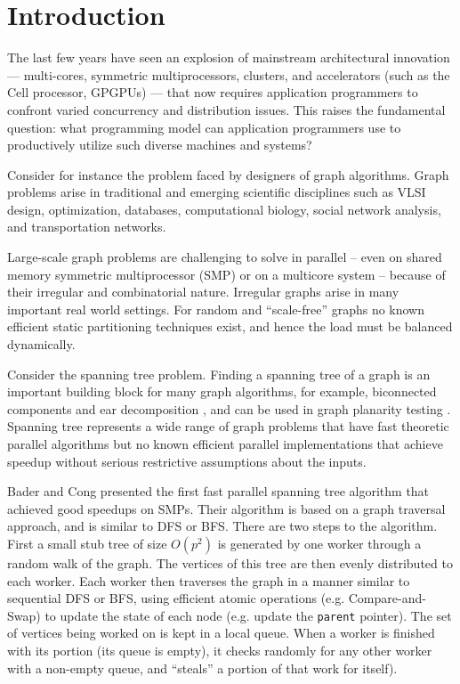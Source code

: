 
\section{Introduction}
\label{s:intr}\label{sec:intro}

The last few years have seen an explosion of mainstream architectural
innovation --- multi-cores, symmetric multiprocessors, clusters, and
accelerators (such as the Cell processor, GPGPUs) --- that now
requires application programmers to confront varied concurrency and
distribution issues. This raises the fundamental question: what
programming model can application programmers use to productively utilize
such diverse machines and systems?

Consider for instance the problem faced by designers of graph
algorithms.  Graph problems arise in traditional and
emerging scientific disciplines such as VLSI design, optimization,
databases, computational biology, social network analysis, and
transportation networks.

Large-scale graph problems are challenging to solve in parallel --
even on shared memory symmetric multiprocessor (SMP) or on a multicore
system -- because of their irregular and combinatorial nature.
Irregular graphs arise in many important real world settings. For
random and ``scale-free'' graphs \cite{CZF04} no known efficient
static partitioning techniques exist, and hence the load must be
balanced dynamically.  

Consider the spanning tree problem. Finding a spanning tree of a graph
is an important building block for many graph algorithms, for example,
biconnected components and ear decomposition \cite{MR86}, and can be
used in graph planarity testing \cite{KR88}.  Spanning tree represents
a wide range of graph problems that have fast theoretic parallel
algorithms but no known efficient parallel implementations that
achieve speedup without serious restrictive assumptions about the
inputs.

Bader and Cong \cite{BC04a} presented the first fast parallel spanning
tree algorithm that achieved good speedups on SMPs. Their algorithm is
based on a graph traversal approach, and is similar to DFS or BFS.
There are two steps to the algorithm. First a small stub tree of size
$O(p^2)$ is generated by one worker through a random walk of the
graph. The vertices of this tree are then evenly distributed to each
worker.  Each worker then traverses the graph in a manner similar to
sequential DFS or BFS, using efficient atomic operations (e.g.{}
Compare-and-Swap) to update the state of each node (e.g.{} update the
{\tt parent} pointer). The set of vertices being worked on is kept in a
local queue.  When a worker is finished with its portion (its queue is
empty), it checks randomly for any other worker with a non-empty
queue, and ``steals'' a portion of that work for itself).

